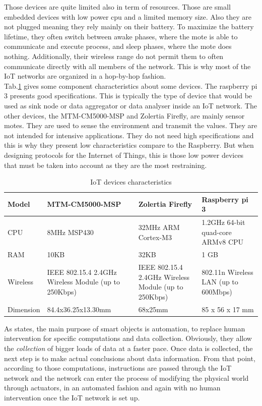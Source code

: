 Those devices are quite limited also in term of resources. Those are small embedded devices with low power cpu and a limited memory size. Also they are not plugged meaning they rely mainly on their battery. To maximize the battery lifetime, they often switch between awake phases, where the mote is able to communicate and execute process, and sleep phases, where the mote does nothing. Additionally, their wireless range do not permit them to often communicate directly with all members of the network. This is why most of the IoT networks are organized in a hop-by-hop fashion. \\

Tab.\ref{tab:sensors_char} gives some component characteristics about some devices. The raspberry pi 3 presents good specifications. This is typically the type of device that would be used as sink node or data aggregator or data analyser inside an IoT network. The other devices, the MTM-CM5000-MSP and Zolertia Firefly, are mainly sensor motes. They are used to sense the environment and transmit the values. They are not intended for intensive applications. They do not need high specifications and this is why they present low characteristics compare to the Raspberry. But when designing protocols for the Internet of Things, this is those low power devices that must be taken into account as they are the most restraining. \\

\begin{table}
  \centering
  \begin{tabularx}{\textwidth}{|X|X|X|X|}
    \hline
    Model & MTM-CM5000-MSP & Zolertia Firefly & Raspberry pi 3 \\ \hline
    CPU & 8MHz MSP430 & 32MHz ARM Cortex-M3 & 1.2GHz 64-bit quad-core ARMv8 CPU\\ \hline
    RAM & 10KB & 32KB & 1 GB \\ \hline
    Wireless & IEEE 802.15.4 2.4GHz Wireless Module (up to 250Kbps) & IEEE 802.15.4 2.4GHz Wireless Module (up to 250Kbps) & 802.11n Wireless LAN (up to 600Mbps)\\ \hline
    Dimension & 84.4x36.25x13.30mm & 68x25mm & 85 x 56 x 17 mm \\ \hline
  \end{tabularx}
  \caption{IoT devices characteristics}
  \label{tab:sensors_char}

\end{table}

As \cite{chui2010internet} states, the main purpose of smart objects is automation, to replace human intervention for specific computations and data collection. Obviously, they allow the \textit{collection} of bigger loads of data at a faster pace. Once data is collected, the next step is to make actual conclusions about data information. From that point, according to those computations, instructions are passed through the IoT network and the network can enter the process of modifying the physical world through actuators, in an automated fashion and again with no human intervention once the IoT network is set up.\\

